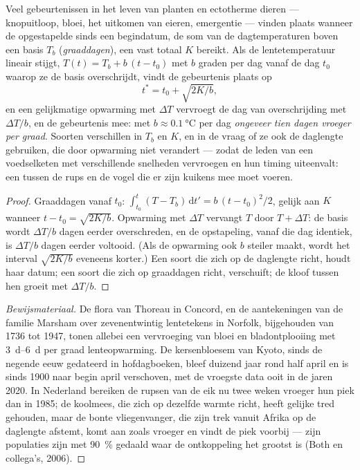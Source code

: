 \begin{theorem}\label{thm:b2:global-change:phenology}
Veel gebeurtenissen in het leven van planten en ectotherme dieren ---
knopuitloop, bloei, het uitkomen van eieren, emergentie --- vinden plaats
wanneer de opgestapelde \emph{} sinds een begindatum, de som van
de dagtemperaturen boven een basis $T_b$ (\emph{graaddagen}), een
vast totaal $K$ bereikt. Als de lentetemperatuur lineair stijgt, $T(t) = T_b
+ b\,(t - t_0)$ met $b$ graden per dag vanaf de dag $t_0$ waarop ze
de basis overschrijdt, vindt de gebeurtenis plaats op
\[
t^{*} = t_0 + \sqrt{2K/b},
\]
en een gelijkmatige opwarming met $\Delta T$ vervroegt de dag van overschrijding
met $\Delta T/b$, en de gebeurtenis mee: met $b \approx
\qty{0.1}{\celsius}$ per dag \emph{ongeveer tien dagen vroeger per
graad}. Soorten verschillen in $T_b$ en $K$, en in de vraag of ze ook de
daglengte gebruiken, die door opwarming niet verandert --- zodat de leden van
een voedselketen met verschillende snelheden vervroegen en hun timing
uiteenvalt: een \emph{} tussen de rups en
de vogel die er zijn kuikens mee moet voeren.
\end{theorem}
\begin{proof}
Graaddagen vanaf $t_0$: $\int_{t_0}^{t}(T - T_b)\,\mathrm{d}t' =
b\,(t - t_0)^{2}/2$, gelijk aan $K$ wanneer $t - t_0 = \sqrt{2K/b}$.
Opwarming met $\Delta T$ vervangt $T$ door $T + \Delta T$: de basis wordt
$\Delta T/b$ dagen eerder overschreden, en de opstapeling, vanaf die dag
identiek, is $\Delta T/b$ dagen eerder voltooid. (Als de opwarming ook $b$
steiler maakt, wordt het interval $\sqrt{2K/b}$ eveneens korter.) Een soort
die zich op de daglengte richt, houdt haar datum; een soort die zich op
graaddagen richt, verschuift; de kloof tussen hen groeit met $\Delta T/b$.
\end{proof}
\begin{proof}[Bewijsmateriaal]
De flora van Thoreau in Concord, en de aantekeningen van de familie Marsham
over zevenentwintig lentetekens in Norfolk, bijgehouden van 1736 tot 1947,
tonen allebei een vervroeging van bloei en bladontplooiing met
\qtyrange{3}{6}{d} per graad lenteopwarming. De kersenbloesem van Kyoto,
sinds de negende eeuw gedateerd in hofdagboeken, bleef duizend jaar rond
half april en is sinds 1900 naar begin april verschoven, met de
vroegste data ooit in de jaren 2020. In Nederland bereiken de rupsen van de
eik nu twee weken vroeger hun piek dan in 1985; de koolmees, die zich op
dezelfde warmte richt, heeft gelijke tred gehouden, maar de bonte
vliegenvanger, die zijn trek vanuit Afrika op de daglengte afstemt, komt aan
zoals vroeger en vindt de piek voorbij --- zijn populaties zijn met
\qty{90}{\%} gedaald waar de ontkoppeling het grootst is (Both en
collega's, 2006).
\end{proof}

